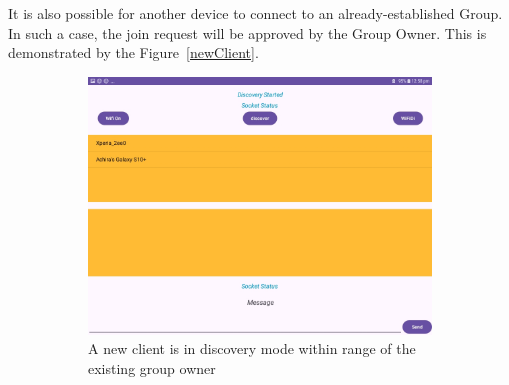 It is also possible for another device to connect to an already-established
Group. In such a case, the join request will be approved by the Group Owner.
This is demonstrated by the Figure~\ref{newClient}.

\begin{figure}
    \centering
    \begin{subfigure}[b]{0.6\textwidth}
        \includegraphics[width=\textwidth,
            height=0.4\textheight]{imgs/discovery-newclient.jpg}
        \caption{A new client is in discovery mode within range of the existing
            group owner}
        \label{newClient:discover}
    \end{subfigure}
    \hspace{1cm}
    \begin{subfigure}[b]{0.3\textwidth}

\end{subfigure}
\end{figure}
